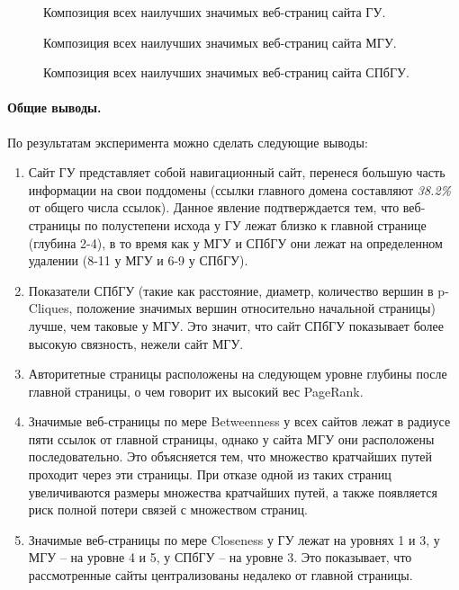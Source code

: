 \begin{figure}[ht]
	\caption{Композиция всех наилучших значимых веб-страниц сайта ГУ.}\label{fig:harvardUComposition}
\end{figure}

\begin{figure}[ht]
	\caption{Композиция всех наилучших значимых веб-страниц сайта МГУ.}\label{fig:moscowSUComposition}
\end{figure}

\begin{figure}[ht]
	\caption{Композиция всех наилучших значимых веб-страниц сайта СПбГУ.}\label{fig:spbUComposition}
\end{figure}

\paragraph{Общие выводы.} По результатам эксперимента можно сделать следующие выводы:
\begin{enumerate}
	\item Сайт ГУ представляет собой навигационный сайт, перенеся большую часть информации на свои поддомены (ссылки главного домена составляют \textit{38.2\%} от общего числа ссылок). Данное явление подтверждается тем, что веб-страницы по полустепени исхода у ГУ лежат близко к главной странице (глубина 2-4), в то время как у МГУ и СПбГУ они лежат на определенном удалении (8-11 у МГУ и 6-9 у СПбГУ).
	\item Показатели СПбГУ (такие как расстояние, диаметр, количество вершин в p-Cliques, положение значимых вершин относительно начальной страницы) лучше, чем таковые у МГУ. Это значит, что сайт СПбГУ показывает более высокую связность, нежели сайт МГУ.
	\item Авторитетные страницы расположены на следующем уровне глубины после главной страницы, о чем говорит их высокий вес PageRank.
	\item Значимые веб-страницы по мере Betweenness у всех сайтов лежат в радиусе пяти ссылок от главной страницы, однако у сайта МГУ они расположены последовательно. Это объясняется тем, что множество кратчайших путей проходит через эти страницы. При отказе одной из таких страниц увеличиваются размеры множества кратчайших путей, а также появляется риск полной потери связей с множеством страниц.
	\item Значимые веб-страницы по мере Closeness у ГУ лежат на уровнях 1 и 3, у МГУ -- на уровне 4 и 5, у СПбГУ -- на уровне 3. Это показывает, что рассмотренные сайты централизованы недалеко от главной страницы.
\end{enumerate}

